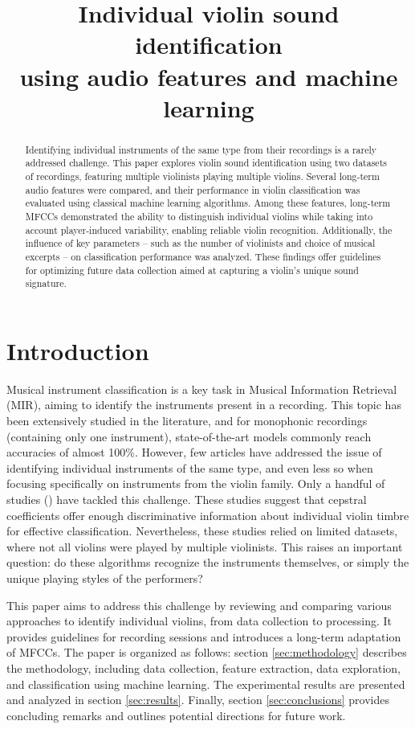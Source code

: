 \documentclass[11pt]{article}
\title{Individual violin sound identification \\ using audio features and machine learning}
\begin{document}
\maketitle
\begin{abstract}
Identifying individual instruments of the same type from their recordings is a rarely addressed challenge. This paper explores violin sound identification using two datasets of recordings, featuring multiple violinists playing multiple violins. Several long-term audio features were compared, and their performance in violin classification was evaluated using classical machine learning algorithms. Among these features, long-term MFCCs demonstrated the ability to distinguish individual violins while taking into account player-induced variability, enabling reliable violin recognition. Additionally, the influence of key parameters -- such as the number of violinists and choice of musical excerpts -- on classification performance was analyzed. These findings offer guidelines for optimizing future data collection aimed at capturing a violin's unique sound signature.
\end{abstract}
%

\section{Introduction}\label{sec:introduction}
Musical instrument classification is a key task in Musical Information Retrieval (MIR), aiming to identify the instruments present in a recording. This topic has been extensively studied in the literature, and for monophonic recordings (containing only one instrument), state-of-the-art models commonly reach accuracies of almost 100\%. 
However, few articles have addressed the issue of identifying individual instruments of the same type, and even less so when focusing specifically on instruments from the violin family.
Only a handful of studies (\cite{lukasik2010, wang2020, yokoyama2022a}) have tackled this challenge. These studies suggest that cepstral coefficients offer enough discriminative information about individual violin timbre for effective classification. Nevertheless, these studies relied on limited datasets, where not all violins were played by multiple violinists. This raises an important question: do these algorithms recognize the instruments themselves, or simply the unique playing styles of the performers?

\noindent This paper aims to address this challenge by reviewing and comparing various approaches to identify individual violins, from data collection to processing. It provides guidelines for recording sessions and introduces a long-term adaptation of MFCCs. The paper is organized as follows: section \ref{sec:methodology} describes the methodology, including data collection, feature extraction, data exploration, and classification using machine learning. The experimental results are presented and analyzed in section \ref{sec:results}. Finally, section \ref{sec:conclusions} provides concluding remarks and outlines potential directions for future work.
\end{document}
